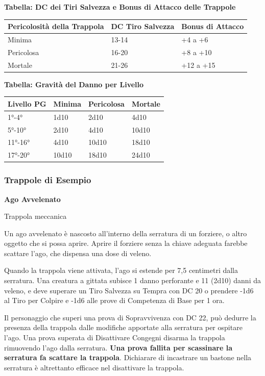 \begin{multicols}{2}
\medskip

\textbf{Tabella: DC dei Tiri Salvezza e Bonus di Attacco delle Trappole}

\medskip

\noindent\begin{tabularx}{0.48\textwidth}{X|X|X}
Pericolosità della Trappola&DC Tiro Salvezza& Bonus di Attacco\\
\toprule
Minima&13-14&+4 a +6\\
Pericolosa&16-20&+8 a +10\\
Mortale&21-26&+12 a +15
\end{tabularx}

\medskip

\textbf{Tabella: Gravità del Danno per Livello}

\medskip

\noindent\begin{tabularx}{0.48\textwidth}{X|X|X|X}
Livello PG&Minima&Pericolosa&Mortale\\
\toprule
1°-4°&1d10&2d10&4d10\\
5°-10°&2d10&4d10&10d10\\
11°-16°&4d10&10d10&18d10\\
17°-20°&10d10&18d10&24d10
\end{tabularx}

\medskip

\subsubsection{Trappole di Esempio}\hypertarget{trappoleesempio}{}\label{trappoleesempio}
\textbf{Ago Avvelenato}

Trappola meccanica

Un ago avvelenato è nascosto all'interno della serratura di un forziere, o altro oggetto che si possa aprire. Aprire il forziere senza la chiave adeguata farebbe scattare l'ago, che dispensa una dose di veleno.

Quando la trappola viene attivata, l'ago si estende per 7,5 centimetri dalla serratura. Una creatura a gittata subisce 1 danno perforante e 11 (2d10) danni da veleno, e deve superare un Tiro Salvezza su Tempra con DC 20 o prendere -1d6 al Tiro per Colpire e -1d6 alle prove di Competenza di Base per 1 ora.

Il personaggio che superi una prova di Sopravvivenza con DC 22, può dedurre la presenza della trappola dalle modifiche apportate alla serratura per ospitare l'ago. Una prova superata di Disattivare Congegni disarma la trappola rimuovendo l'ago dalla serratura. \textbf{Una prova fallita per scassinare la serratura fa scattare la trappola}. Dichiarare di incastrare un bastone nella serratura è altrettanto efficace nel disattivare la trappola.


\end{multicols}
